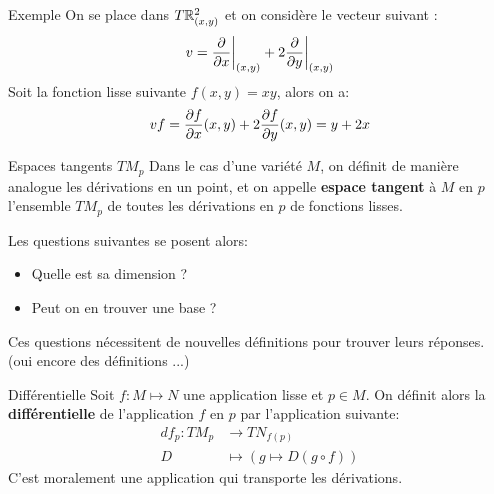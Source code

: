 \documentclass{beamer}
\begin{document}
        \begin{frame}{Exemple}
            On se place dans $T\mathbb{R}^2_{(x, y)}$ et on considère le vecteur suivant :
            \[
                v = \frac{\partial }{\partial x}\bigg|_{(x, y)} + 2\frac{\partial }{\partial y}\bigg|_{(x, y)}
            \]
            Soit la fonction lisse suivante \( f(x, y) = xy \), alors on a:
            \[ 
               vf = \frac{\partial f}{\partial x}(x, y) + 2\frac{\partial f}{\partial y}(x, y) = y + 2x
            \]
        \end{frame}
        \begin{frame}{Espaces tangents $TM_p$}
            Dans le cas d'une variété $M$, on définit de manière analogue les dérivations en un point, et on appelle \textbf{espace tangent} à \( M \) en \( p \) l'ensemble \( TM_p \) de toutes les dérivations en \( p \) de fonctions lisses.\<

            Les questions suivantes se posent alors:
            \begin{itemize}
               \item Quelle est sa dimension ?
               \item Peut on en trouver une base ?
            \end{itemize}
            Ces questions nécessitent de nouvelles définitions pour trouver leurs réponses. (oui encore des définitions ...)
        \end{frame}
        \begin{frame}{Différentielle}
            Soit \( f : M \longmapsto N \) une application lisse et \( p \in M \). On définit alors la \textbf{différentielle} de l'application \( f \) en \( p \) par l'application suivante:
            \[ 
                \begin{aligned}
                    df_p : TM_p &\longrightarrow TN_{f(p)} \\
                    D &\longmapsto \left( g \longmapsto D(g \circ f) \right)
                \end{aligned} 
            \]
            C'est moralement une application qui transporte les dérivations.
        \end{frame}
\end{document}
